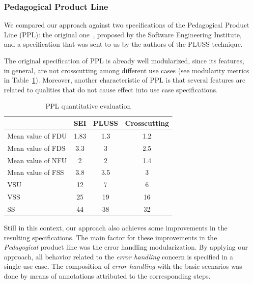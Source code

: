 \documentclass[11pt]{report}
\begin{document}
\subsubsection{Pedagogical Product Line}

We compared our approach against two specifications of the Pedagogical Product Line (PPL): the original one~\cite{ppl-url}, proposed by the Software Engineering Institute, and a specification that was sent to us by the authors of the PLUSS technique. 

The original specification of PPL is already well modularized, since its features, in general, are not crosscutting among different use cases (see modularity metrics in Table~\ref{tab:ppl-metrics}). Moreover, another characteristic of PPL is that several features are related to qualities that do not cause effect into use case specifications. 

\begin{table}[hb]
\centering
 \caption{PPL quantitative evaluation}
\label{tab:ppl-metrics}
\begin{small}
\begin{tabular}{lccc} \hline
					& SEI 	& PLUSS 	& Crosscutting	\\ \hline
Mean value of FDU 		& 1.83	& 1.3	& 1.2	\\
Mean value of FDS 		& 3.3	& 3		& 2.5	\\
Mean value of NFU 		& 2		& 2		& 1.4	\\
Mean value of FSS 		& 3.8	& 3.5	& 3		\\ 
VSU 					& 12		& 7		& 6		\\
VSS 					& 25		& 19		& 16		\\
SS 					& 44		& 38		& 32		\\	\hline
\end{tabular}
\end{small}
\end{table}

Still in this context, our approach also achieves some improvements in the resulting specifications. The main factor for these improvements in the \emph{Pedagogical} product line was the error handling modularization. By applying our approach, all behavior related to the \emph{error handling} concern is specified in a single use case. The composition of \emph{error handling} with the basic scenarios was done by means of annotations attributed to the corresponding steps. 

\end{document}
